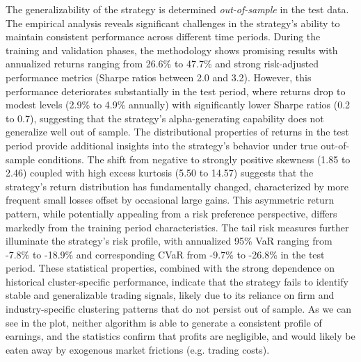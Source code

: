 The generalizability of the strategy is determined \textit{out-of-sample} in the test data. The empirical analysis reveals significant challenges in the strategy's ability to maintain consistent performance across different time periods. During the training and validation phases, the methodology shows promising results with annualized returns ranging from 26.6\% to 47.7\% and strong risk-adjusted performance metrics (Sharpe ratios between 2.0 and 3.2). However, this performance deteriorates substantially in the test period, where returns drop to modest levels (2.9\% to 4.9\% annually) with significantly lower Sharpe ratios (0.2 to 0.7), suggesting that the strategy's alpha-generating capability does not generalize well out of sample. The distributional properties of returns in the test period provide additional insights into the strategy's behavior under true out-of-sample conditions. The shift from negative to strongly positive skewness (1.85 to 2.46) coupled with high excess kurtosis (5.50 to 14.57) suggests that the strategy's return distribution has fundamentally changed, characterized by more frequent small losses offset by occasional large gains. This asymmetric return pattern, while potentially appealing from a risk preference perspective, differs markedly from the training period characteristics. The tail risk measures further illuminate the strategy's risk profile, with annualized 95\% VaR ranging from -7.8\% to -18.9\% and corresponding CVaR from -9.7\% to -26.8\% in the test period. These statistical properties, combined with the strong dependence on historical cluster-specific performance, indicate that the strategy fails to identify stable and generalizable trading signals, likely due to its reliance on firm and industry-specific clustering patterns that do not persist out of sample. As we can see in the plot, neither algorithm is able to generate a consistent profile of earnings, and the statistics confirm that profits are negligible, and would likely be eaten away by exogenous market frictions (e.g. trading costs).

